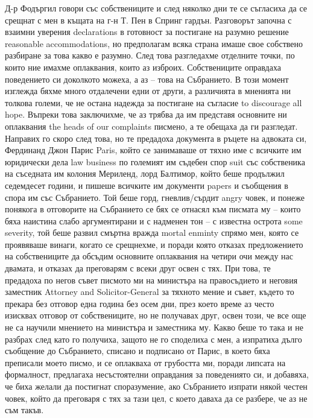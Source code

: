 \documentclass[12pt]{book}
\begin{document}
Д-р Фодъргил говори със собствениците и след няколко дни те се съгласиха да се срещнат с мен в къщата на г-н Т. Пен в Спринг гардън. Разговорът започна с взаимни уверения declarations в готовност за постигане на разумно решение reasonable accommodations, но предполагам всяка страна имаше свое собствено разбиране за това какво е разумно. След това разгледахме отделните точки, по които ние имахме оплаквания, които аз изброих. Собствениците оправдаха поведението си доколкото можеха, а аз – това на Събранието.  В този момент изглежда бяхме много отдалечени едни от други, а различията в мненията ни толкова големи, че не остана надежда за постигане на съгласие to discourage all hope. Въпреки това заключихме, че аз трябва да им представя основните ни оплаквания the heads of our complaints писмено, а те обещаха да ги разгледат. Направих го скоро след това, но те предадоха документа в ръцете на адвоката си, Фердинанд Джон Парис Paris, който се занимаваше от тяхно име с всичките им юридически дела law business по големият им съдебен спор suit със собственика на съседната им колония Мериленд, лорд Балтимор, който беше продължил седемдесет години, и пишеше всичките им документи papers и съобщения в спора им със Събранието. Той беше горд, гневлив/сърдит angry човек, и понеже понякога в отговорите на Събранието се бях се отнасял към писмата му – които бяха наистина слабо аргументирани и с надменен тон – с известна острота some severity, той беше развил смъртна вражда mortal enminty спрямо мен, която се проявяваше винаги, когато се срещнехме, и поради която отказах предложението на собствениците да обсъдим основните оплаквания на четири очи между нас двамата, и отказах да преговарям с всеки друг освен с тях. При това, те предадоха по негов съвет писмото ми на министъра на правосъдието и неговия заместник Attorney and Solicitor-General за тяхното мение и съвет, където то прекара без отговор една година без осем дни, през което време аз често изисквах отговор от собствениците, но не получавах друг, освен този, че все още не са научили мнението на министъра и заместника му. Какво беше то така и не разбрах след като го получиха, защото не го споделиха с мен, а изпратиха дълго съобщение до Събранието, списано и подписано от Парис, в което бяха преписали моето писмо, и се оплакваха от грубостта ми, поради липсата на формалност, предлагаха несъстоятелни оправдания за поведениято си, и добавяха, че биха желали да постигнат споразумение, ако Събранието изпрати някой честен човек, който да преговаря с тях за тази цел, с което даваха да се разбере, че аз не съм такъв. 
\end{document}
